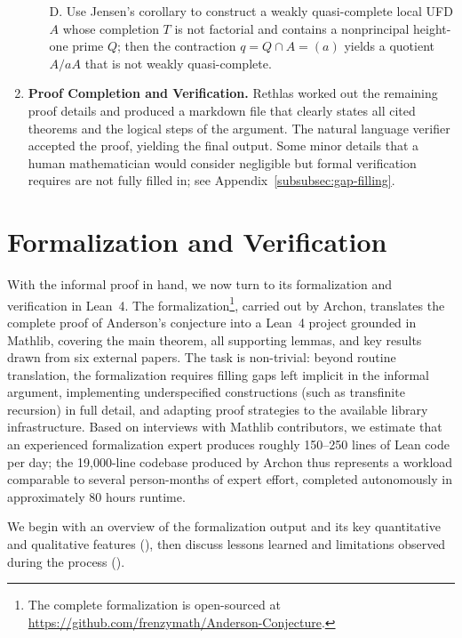 \documentclass[]{pkuai4m}
\theoremstyle{plain}
\theoremstyle{definition}
\begin{document}
\begin{enumerate}[leftmargin=*]
    \begin{enumerate}[leftmargin=*]
        \item[D.] Use Jensen's corollary to construct a weakly quasi-complete local UFD \(A\) whose completion \(T\) is not factorial and contains a nonprincipal height-one prime \(Q\); then the contraction \(q = Q \cap A = (a)\) yields a quotient \(A/aA\) that is not weakly quasi-complete.
    \end{enumerate}
    \item \textbf{Proof Completion and Verification.} Rethlas worked out the remaining proof details and produced a markdown file that clearly states all cited theorems and the logical steps of the argument. The natural language verifier accepted the proof, yielding the final output. Some minor details that a human mathematician would consider negligible but formal verification requires are not fully filled in; see Appendix~\ref{subsubsec:gap-filling}.
\end{enumerate}

\section{Formalization and Verification}\label{sec:archon_results}

With the informal proof in hand, we now turn to its formalization and verification in Lean~4. The formalization\footnote{The complete formalization is open-sourced at \url{https://github.com/frenzymath/Anderson-Conjecture}.}, carried out by Archon, translates the complete proof of Anderson's conjecture into a Lean~4 project grounded in Mathlib, covering the main theorem, all supporting lemmas, and key results drawn from six external papers. The task is non-trivial: beyond routine translation, the formalization requires filling gaps left implicit in the informal argument, implementing underspecified constructions (such as transfinite recursion) in full detail, and adapting proof strategies to the available library infrastructure. Based on interviews with Mathlib contributors, we estimate that an experienced formalization expert produces roughly 150--250 lines of Lean code per day; the 19{,}000-line codebase produced by Archon thus represents a workload comparable to several person-months of expert effort, completed autonomously in approximately 80 hours runtime.

We begin with an overview of the formalization output and its key quantitative and qualitative features (), then discuss lessons learned and limitations observed during the process ().
\end{document}
